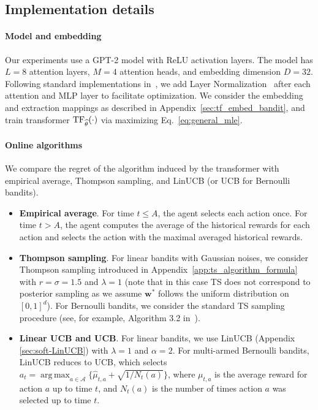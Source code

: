 \documentclass[10pt]{article}
\renewcommand{\hat}{\widehat}
\DeclareMathOperator*{\argmax}{arg\,max}
\newcommand{\<}{\left\langle}
\renewcommand{\>}{\right\rangle}
\newcommand{\TF}{{\rm TF}}
\newcommand{\Tpsparn}{{r}}
\newcommand{\action}{{a}}
\newcommand{\EstPar}{{\widehat{\theta}}}
\newcommand{\actionsp}{{\mathcal{A}}}
\newcommand{\Numvi}{{N}}
\def\bw{{\mathbf w}}
\begin{document}
\subsection{Implementation details}
\paragraph{Model and embedding}
Our experiments use a GPT-2 model \citep{radford2019language} with ReLU activation layers. The model has $L=8$ attention layers, $M=4$ attention heads, and embedding dimension $D=32$. Following standard implementations in~\cite{vaswani2017attention}, we add Layer Normalization~\citep{ba2016layer} after each attention and MLP layer to facilitate optimization. We consider the embedding and extraction mappings as described in Appendix~\ref{sec:tf_embed_bandit}, and train transformer $\TF_{\EstPar}(\cdot)$ via  maximizing Eq.~\eqref{eq:general_mle}.
\paragraph{Online algorithms}
We compare the regret of the algorithm induced by the transformer with empirical average, Thompson sampling, and LinUCB (or UCB for Bernoulli bandits).
\begin{itemize}
\item[\textbf{(Emp)}]\textbf{Empirical average}.
For time $t\leq A$, the agent selects each action once. For time $t>A$, the agent computes the average of the historical rewards for each action and selects the action with the maximal
averaged historical rewards.
\item[\textbf{(TS)}]\textbf{Thompson sampling}. For linear bandits with Gaussian noises, we consider Thompson sampling introduced in Appendix~\ref{app:ts_algorithm_formula} with $\Tpsparn=\sigma=1.5$ and $\lambda=1$ (note that in this case TS does not correspond to posterior sampling as we assume $\bw^*$ follows the uniform distribution on $[0,1]^d$). For Bernoulli bandits,  we consider the standard TS sampling procedure (see, for example, Algorithm 3.2 in~\cite{russo2018tutorial}).
\item[\textbf{(LinUCB)}]\textbf{Linear UCB and UCB}. For linear bandits, we use LinUCB (Appendix \ref{sec:soft-LinUCB}) with $\lambda=1$ and $\alpha=2$. For multi-armed Bernoulli bandits, LinUCB reduces to UCB, which selects $\action_t=\argmax_{\action\in\actionsp}\{\hat \mu_{t,\action}+\sqrt{1/\Numvi_t(\action)}\}$, where $\mu_{t,\action}$ is the average reward for action $\action$ up to time $t$, and $\Numvi_t(\action)$ is the number of times action $\action$ was selected up to time $t$.
\end{itemize}
\end{document}
